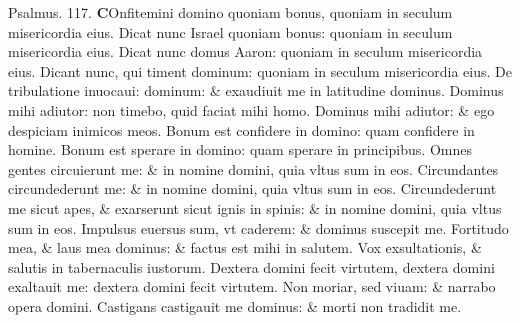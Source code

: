\documentclass[a5paper,10pt]{book}
\begin{document}
\begin{multicols*}{2}
\newline \color{red} Psalmus. 117. \color{black}
\vspace{-.5em}
\lettrine[lines=2]{\bfseries \color{red} C}{}Onfitemini domino quoniam bonus, quoniam in seculum misericordia eius.
\newline \color{red} D\color{black}icat nunc Israel quoniam bonus: quoniam in seculum misericordia eius.
\newline \color{red} D\color{black}icat nunc domus Aaron: quoniam in seculum misericordia eius.
\newline \color{red} D\color{black}icant nunc, qui timent dominum: quoniam in seculum misericordia eius.
\newline \color{red} D\color{black}e tribulatione inuocaui: dominum: \& exaudiuit me in latitudine dominus.
\newline \color{red} D\color{black}ominus mihi adiutor: non timebo, quid faciat mihi homo.
\newline \color{red} D\color{black}ominus mihi adiutor: \& ego despiciam inimicos meos.
\newline \color{red} B\color{black}onum est confidere in domino: quam confidere in homine.
\newline \color{red} B\color{black}onum est sperare in domino: quam sperare in principibus.
\newline \color{red} O\color{black}mnes gentes circuierunt me: \& in nomine domini, quia vltus sum in eos.
\newline \color{red} C\color{black}ircundantes circundederunt me: \& in nomine domini, quia vltus sum in eos.
\newline \color{red} C\color{black}ircundederunt me sicut apes, \& exarserunt sicut ignis in spinis: \& in nomine domini, quia vltus sum in eos.
\newline \color{red} I\color{black}mpulsus euersus sum, vt caderem: \& dominus suscepit me.
\newline \color{red} F\color{black}ortitudo mea, \& laus mea dominus: \& factus est mihi in salutem.
\newline \color{red} V\color{black}ox exsultationis, \& salutis in tabernaculis iustorum.
\newline \color{red} D\color{black}extera domini fecit virtutem, dextera domini exaltauit me: dextera domini fecit virtutem.
\newline \color{red} N\color{black}on moriar, sed viuam: \& narrabo opera domini.
\newline \color{red} C\color{black}astigans castigauit me dominus: \& morti non tradidit me.

\end{multicols*}
\end{document}
